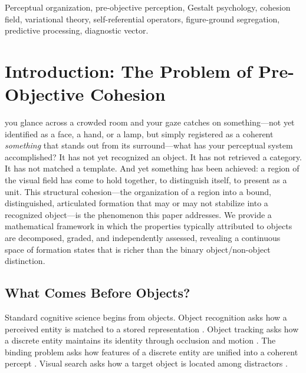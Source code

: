 \documentclass[lettersize,journal]{IEEEtran}
\begin{document}
\begin{abstract}
proves transport fixed-point existence, isoperimetric energy ordering, and the spectral phase-transition threshold, while recent continuation-access audits show that some low-energy branch families are easy to preserve once reached yet difficult to access from raw search, so branch-selection and merge claims must be stated with explicit protocol tags rather than as branch-free universals.
\end{abstract}

\begin{IEEEkeywords}
Perceptual organization, pre-objective perception, Gestalt psychology, cohesion field, variational theory, self-referential operators, figure-ground segregation, predictive processing, diagnostic vector.
\end{IEEEkeywords}

\section{Introduction: The Problem of Pre-Objective Cohesion}

 you glance across a crowded room and your gaze catches on something---not yet identified as a face, a hand, or a lamp, but simply registered as a coherent \emph{something} that stands out from its surround---what has your perceptual system accomplished? It has not yet recognized an object. It has not retrieved a category. It has not matched a template. And yet something has been achieved: a region of the visual field has come to hold together, to distinguish itself, to present as a unit. This structural cohesion---the organization of a region into a bound, distinguished, articulated formation that may or may not stabilize into a recognized object---is the phenomenon this paper addresses. We provide a mathematical framework in which the properties typically attributed to objects are decomposed, graded, and independently assessed, revealing a continuous space of formation states that is richer than the binary object/non-object distinction.

\subsection{What Comes Before Objects?}

Standard cognitive science begins from objects. Object recognition asks how a perceived entity is matched to a stored representation \cite{biederman1987recognition}. Object tracking asks how a discrete entity maintains its identity through occlusion and motion \cite{pylyshyn1988tracking}. The binding problem asks how features of a discrete entity are unified into a coherent percept \cite{treisman1996binding}. Visual search asks how a target object is located among distractors \cite{wolfe1994guided}.
\end{document}
